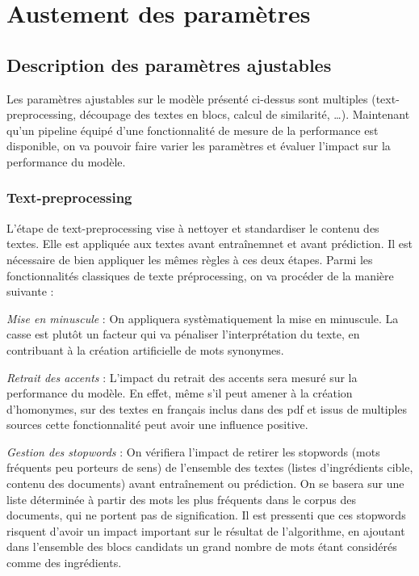     \chapter{Austement des paramètres}
        \section{Description des paramètres ajustables}

        Les paramètres ajustables sur le modèle présenté ci-dessus sont multiples (text-preprocessing, découpage des textes en blocs, calcul de similarité, \dots).
        Maintenant qu'un pipeline équipé d'une fonctionnalité de mesure de la performance est disponible, on va pouvoir faire varier les paramètres et évaluer l'impact sur la performance du modèle.

        \subsection{Text-preprocessing}

        L'étape de text-preprocessing vise à nettoyer et standardiser le contenu des textes.
        Elle est appliquée aux textes avant entraînemnet et avant prédiction.
        Il est nécessaire de bien appliquer les mêmes règles à ces deux étapes.
        Parmi les fonctionnalités classiques de texte préprocessing, on va procéder de la manière suivante : 

        \emph{Mise en minuscule} : 
        On appliquera systèmatiquement la mise en minuscule. 
        La casse est plutôt un facteur qui va pénaliser l'interprétation du texte, en contribuant à la création artificielle de mots synonymes.

        \emph{Retrait des accents} : 
        L'impact du retrait des accents sera mesuré sur la performance du modèle.
        En effet, même s'il peut amener à la création d'homonymes, sur des textes en français inclus dans des pdf et issus de multiples sources cette fonctionnalité peut avoir une influence positive.

        \emph{Gestion des stopwords} : 
        On vérifiera l'impact de retirer les stopwords (mots fréquents peu porteurs de sens) de l'ensemble des textes (listes d'ingrédients cible, contenu des documents) avant entraînement ou prédiction.
        On se basera sur une liste déterminée à partir des mots les plus fréquents dans le corpus des documents, qui ne portent pas de signification.
        Il est pressenti que ces stopwords risquent d'avoir un impact important sur le résultat de l'algorithme, en ajoutant dans l'ensemble des blocs candidats un grand nombre de mots étant considérés comme des ingrédients.

